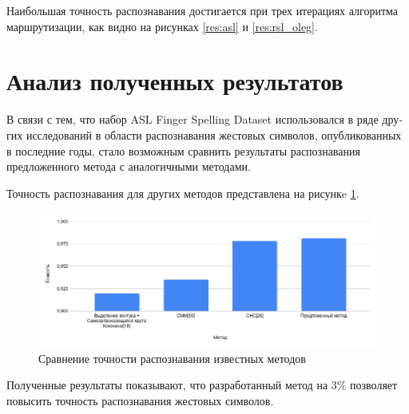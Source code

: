 Наибольшая точность распознавания достигается при трех итерациях алгоритма маршрутизации, как видно на рисунках \ref{res:asl} и \ref{res:rsl_oleg}.

\section{Анализ полученных результатов}

В связи с тем, что набор ASL  Finger Spelling Dataset использовался в ряде дру­гих исследований в области распознавания жестовых символов, опуб­ликованных в последние годы, стало возможным сравнить результаты распознавания предложенного метода с аналогичными методами.

Точность распознавания для других методов представлена на ри­сункe \ref{res:compare}.

\begin{figure}[!h]
	\centering
	\includegraphics[width=\textwidth]{inc/img/compare}
	\caption{Сравнение точности распознавания известных методов}
	\label{res:compare}
\end{figure}

Полученные результаты показывают, что разработанный метод на 3\% позволяет повысить точность распознавания жестовых символов.
